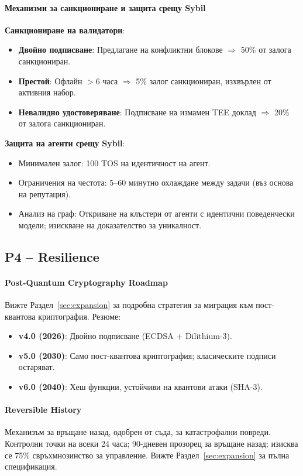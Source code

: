 \documentclass[11pt]{article}
\begin{document}
\paragraph{Механизми за санкциониране и защита срещу Sybil}
\textbf{Санкциониране на валидатори}:
\begin{itemize}[noitemsep]
  \item \textbf{Двойно подписване}: Предлагане на конфликтни блокове $\Rightarrow$ 50\% от залога санкциониран.
  \item \textbf{Престой}: Офлайн $>$6 часа $\Rightarrow$ 5\% залог санкциониран, изхвърлен от активния набор.
  \item \textbf{Невалидно удостоверяване}: Подписване на измамен TEE доклад $\Rightarrow$ 20\% от залога санкциониран.
\end{itemize}

\textbf{Защита на агенти срещу Sybil}:
\begin{itemize}[noitemsep]
  \item Минимален залог: 100 TOS на идентичност на агент.
  \item Ограничения на честота: 5--60 минутно охлаждане между задачи (въз основа на репутация).
  \item Анализ на граф: Откриване на клъстери от агенти с идентични поведенчески модели; изискване на доказателство за уникалност.
\end{itemize}

\subsection{P4 -- Resilience}
\label{sec:pillar-resilience}

\paragraph{Post-Quantum Cryptography Roadmap}
Вижте Раздел~\ref{sec:expansion} за подробна стратегия за миграция към пост-квантова криптография. Резюме:
\begin{itemize}[noitemsep]
  \item \textbf{v4.0 (2026)}: Двойно подписване (ECDSA + Dilithium-3).
  \item \textbf{v5.0 (2030)}: Само пост-квантова криптография; класическите подписи остаряват.
  \item \textbf{v6.0 (2040)}: Хеш функции, устойчиви на квантови атаки (SHA-3).
\end{itemize}

\paragraph{Reversible History}
Механизъм за връщане назад, одобрен от съда, за катастрофални повреди. Контролни точки на всеки 24 часа; 90-дневен прозорец за връщане назад; изисква се 75\% свръхмнозинство за управление. Вижте Раздел~\ref{sec:expansion} за пълна спецификация.
\end{document}
